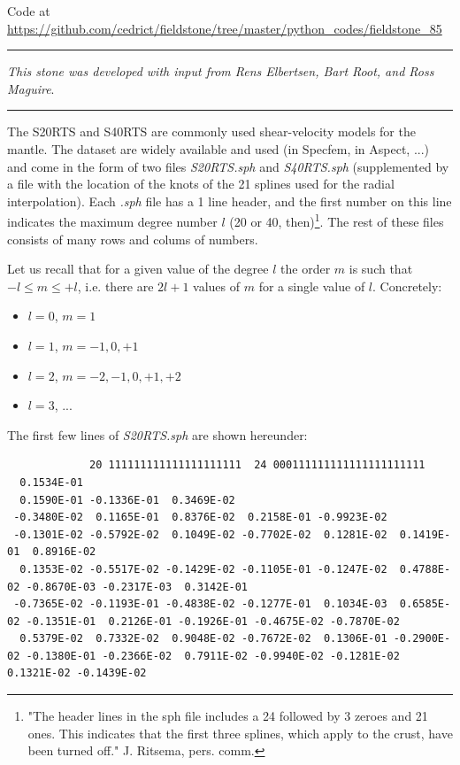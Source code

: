 
\begin{center}
Code at \url{https://github.com/cedrict/fieldstone/tree/master/python_codes/fieldstone_85}
\end{center}

\par\noindent\rule{\textwidth}{0.4pt}

{\sl This stone was developed with input from Rens Elbertsen, Bart Root, and Ross Maguire}. 

\par\noindent\rule{\textwidth}{0.4pt}

\vspace{1cm}



The S20RTS \cite{rivw99} and S40RTS \cite{ridv11} are commonly used shear-velocity models for the mantle.
The dataset are widely available and used (in Specfem, in Aspect, ...) and come in the form of two 
files {\sl S20RTS.sph} and {\sl S40RTS.sph} (supplemented by a file with the location of the knots of the 21 splines
used for the radial interpolation). 
Each {\sl .sph} file has a 1 line header, and the first number on this line indicates the maximum degree number $l$ 
(20 or 40, then)\footnote{
"The header lines in the sph file includes a 24 followed by 3 zeroes and 21 ones. 
This indicates that the first three splines, which apply to the crust, have been turned off."
J. Ritsema, pers. comm.}. The rest of these files consists of many rows and colums of numbers.

Let us recall that for a given value of the degree $l$ the order $m$ is such that $-l \le m \le +l$, i.e. 
there are $2l+1$ values of $m$ for a single value of $l$. Concretely:
\begin{itemize}
\item $l=0$, $m=1$ 
\item $l=1$, $m=-1,0,+1$ 
\item $l=2$, $m=-2,-1,0,+1,+2$ 
\item $l=3$, ...
\end{itemize}
The first few lines of {\sl S20RTS.sph} are shown hereunder:
\begin{tiny}
\begin{verbatim}
             20 111111111111111111111  24 000111111111111111111111 
  0.1534E-01
  0.1590E-01 -0.1336E-01  0.3469E-02
 -0.3480E-02  0.1165E-01  0.8376E-02  0.2158E-01 -0.9923E-02
 -0.1301E-02 -0.5792E-02  0.1049E-02 -0.7702E-02  0.1281E-02  0.1419E-01  0.8916E-02
  0.1353E-02 -0.5517E-02 -0.1429E-02 -0.1105E-01 -0.1247E-02  0.4788E-02 -0.8670E-03 -0.2317E-03  0.3142E-01
 -0.7365E-02 -0.1193E-01 -0.4838E-02 -0.1277E-01  0.1034E-03  0.6585E-02 -0.1351E-01  0.2126E-01 -0.1926E-01 -0.4675E-02 -0.7870E-02
  0.5379E-02  0.7332E-02  0.9048E-02 -0.7672E-02  0.1306E-01 -0.2900E-02 -0.1380E-01 -0.2366E-02  0.7911E-02 -0.9940E-02 -0.1281E-02  0.1321E-02 -0.1439E-02
\end{verbatim}
\end{tiny}

